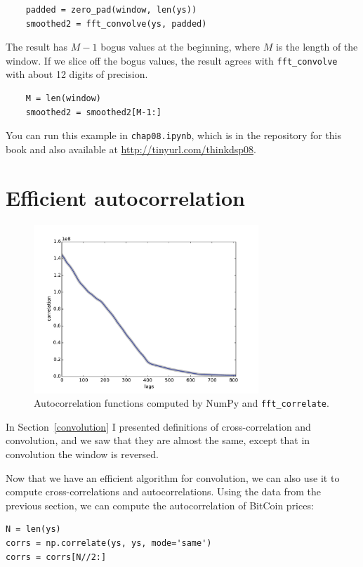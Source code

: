 \documentclass[12pt]{book}
\begin{document}
\begin{verbatim}
    padded = zero_pad(window, len(ys))
    smoothed2 = fft_convolve(ys, padded)
\end{verbatim}

The result has $M-1$ bogus values at the beginning, where $M$ is the
length of the window.  If we slice off the bogus values, the result
agrees with \verb"fft_convolve" with about 12 digits of precision.

\begin{verbatim}
    M = len(window)
    smoothed2 = smoothed2[M-1:]
\end{verbatim}

You can run this example in
{\tt chap08.ipynb}, which is in the repository for this
book and also available at \url{http://tinyurl.com/thinkdsp08}.


\section{Efficient autocorrelation}

\begin{figure}
\centerline{\includegraphics[height=2.5in]{figs/convolution9.pdf}}
\caption{Autocorrelation functions computed by NumPy and
  {\tt fft\_correlate}.}
\label{fig.convolution9}
\end{figure}

In Section~\ref{convolution} I presented definitions of
cross-correlation and convolution, and we saw that they are
almost the same, except that in convolution the window is
reversed.

Now that we have an efficient algorithm for convolution, we
can also use it to compute cross-correlations and autocorrelations.
Using the data from the previous section, we can compute the
autocorrelation of BitCoin prices:

\begin{verbatim}
N = len(ys)
corrs = np.correlate(ys, ys, mode='same')
corrs = corrs[N//2:]
\end{verbatim}
\end{document}

